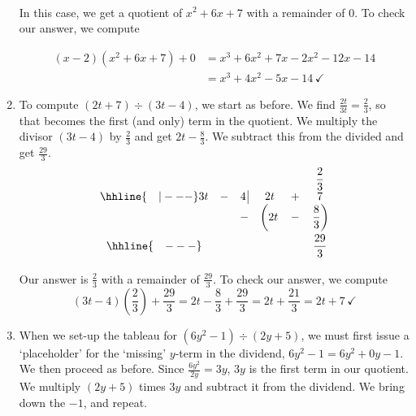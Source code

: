 \begin{ex}
\begin{enumerate}
\[\begin{array}{cccccccccc}
\end{array}\]
\setlength\arraycolsep{5pt}
\setlength\extrarowheight{0pt}

In this case, we get a quotient of $x^2 + 6x + 7$ with a remainder of $0$.  To check our answer, we compute

\begin{align*}
(x-2)\left(x^2 + 6x + 7\right) + 0 &= x^3 + 6x^2 + 7x - 2x^2 - 12x -14 \\
&=  x^3 + 4x^2 - 5x - 14 \, \checkmark
\end{align*}

\item    To compute  $\left(2t +  7\right) \div \left(3t - 4\right)$, we start as before.  We find $\frac{2t}{3t} = \frac{2}{3}$, so that becomes the first (and only) term in the quotient.  We multiply the divisor $(3t-4)$ by $\frac{2}{3}$ and get $2t - \frac{8}{3}$.  We subtract this from the divided and get $\frac{29}{3}$.\setlength\arraycolsep{0.1pt}\setlength\extrarowheight{5pt}\[ \begin{array}{cccccc}

& & & & & \dfrac{2}{3} \\ \hhline{~~~|---}

3t & - & 4 \, \vline& 2t & + & 7  \\

 &  &  -& \left(2t\vphantom{\dfrac{8}{3}} \right. & - & \left.  \dfrac{8}{3}\right)  \\ \hhline{~~~---}
 &  &  &   &  & \dfrac{29}{3} \vphantom{\sqrt{\dfrac{7}{7}}} \\ 

 
\end{array}\]
\setlength\arraycolsep{5pt}
\setlength\extrarowheight{0pt}

Our answer is $\frac{2}{3}$ with a remainder of $\frac{29}{3}$.  To check our answer, we compute \[(3t-4) \left(\frac{2}{3}\right) + \frac{29}{3} = 2t - \frac{8}{3} + \frac{29}{3} = 2t + \frac{21}{3} = 2t + 7 \, \checkmark\]

\item When we set-up the tableau for   $\left(6y^2 - 1 \right) \div \left(2y + 5\right)$, we must first issue a `placeholder' for the `missing' $y$-term in the dividend, $6y^2 -1 = 6y^2 + 0y - 1$.  We then proceed as before.  Since $\frac{6y^2}{2y} = 3y$, $3y$ is the first term in our quotient. We multiply $(2y+5)$ times $3y$ and subtract it from the dividend.  We bring down the $-1$, and repeat.  \setlength\arraycolsep{0.1pt}\setlength\extrarowheight{5pt}\[ \begin{array}{cccccccc}


\end{array}\]
\end{enumerate}
\end{ex}
